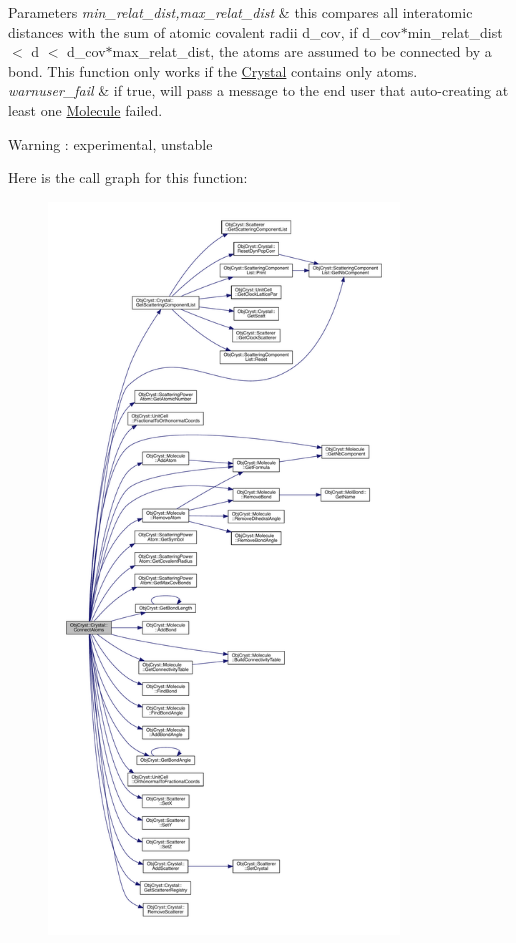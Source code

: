 \begin{DoxyParams}{Parameters}
{\em min\+\_\+relat\+\_\+dist,max\+\_\+relat\+\_\+dist} & this compares all interatomic distances with the sum of atomic covalent radii d\+\_\+cov, if d\+\_\+cov$\ast$min\+\_\+relat\+\_\+dist $<$ d $<$ d\+\_\+cov$\ast$max\+\_\+relat\+\_\+dist, the atoms are assumed to be connected by a bond. This function only works if the \mbox{\hyperlink{class_obj_cryst_1_1_crystal}{Crystal}} contains only atoms. \\
\hline
{\em warnuser\+\_\+fail} & if true, will pass a message to the end user that auto-\/creating at least one \mbox{\hyperlink{class_obj_cryst_1_1_molecule}{Molecule}} failed. \\
\hline
\end{DoxyParams}
\begin{DoxyWarning}{Warning}
\+: experimental, unstable 
\end{DoxyWarning}
Here is the call graph for this function\+:
\nopagebreak
\begin{figure}[H]
\begin{center}
\leavevmode
\includegraphics[height=550pt]{class_obj_cryst_1_1_crystal_a6e7bc69bcb5331e8faf60ef13db1255c_cgraph}
\end{center}
\end{figure}
\mbox{\label{class_obj_cryst_1_1_crystal_a1a2c5c9fed8417d83cef0ef3ff36418e}} 
